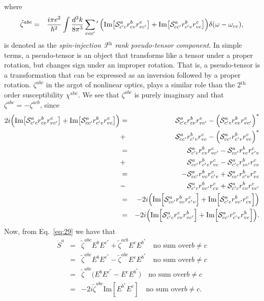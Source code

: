 \documentclass[floatfix,prb,aps,superscriptaddress,11pt]{revtex4}
\begin{document}
where
\begin{eqnarray}\label{trace52}
\tilde\zeta^{abc}
&=&
\frac{i\pi e^2}{\hbar^2}
\int\frac{d^3k}{8\pi^3}
\sum_{vcc'}\phantom{}^\prime\,
\Big(
\mbox{Im}\big[
{\cal S}^a_{c'c}r^b_{cv}r^c_{vc'}
\big]
+
\mbox{Im}\big[
{\cal S}^a_{cc'}r^b_{c'v}r^c_{vc}
\big]
\Big)
\delta(\omega-\omega_{cv})
,
\end{eqnarray}
is
denoted as the \textit{spin-injection 3$^\mathrm{th}$ rank
 pseudo-tensor component}.
 In simple terms, a pseudo-tensor is an object that transforms like a
  tensor under a proper rotation, but changes sign under an improper
  rotation. That is, a pseudo-tensor is a transformation that can be
  expressed as an inversion followed by a proper rotation.
$\zeta^{abc}$ in the argot of nonlinear optics, plays
a similar role than the 2$^\mathrm{th}$ order susceptibility
$\chi^{\mathrm{abc}}$. We see that $\zeta^{abc}$ is purely imaginary
and that $\zeta^{abc}=-\zeta^{acb}$, since 
\begin{eqnarray}\label{proof}
2i\Big(
\mbox{Im}\big[{\cal S}^a_{c'c}r^b_{cv}r^c_{vc'}\big]
+
\mbox{Im}\big[{\cal S}^a_{cc'}r^b_{c'v}r^c_{vc}\big]
\Big)
&=&
{\cal S}^a_{c'c}r^b_{cv}r^c_{vc'}
-
\Big({\cal S}^a_{c'c}r^b_{cv}r^c_{vc'}
\Big)^*
\nonumber \\
&+&
{\cal S}^a_{cc'}r^b_{c'v}r^c_{vc}
-
\Big(
{\cal S}^a_{cc'}r^b_{c'v}r^c_{vc}
\Big)^*
\nonumber \\
&=&
{\cal S}^a_{c'c}r^b_{cv}r^c_{vc'}
-
{\cal S}^a_{cc'}r^b_{vc}r^c_{c'v}
\nonumber \\
&+&
{\cal S}^a_{cc'}r^b_{c'v}r^c_{vc}
-
{\cal S}^a_{c'c}r^b_{vc'}r^c_{cv}
\nonumber \\
&=&
-
{\cal S}^a_{cc'}r^b_{vc}r^c_{c'v}
+
{\cal S}^a_{cc'}r^b_{c'v}r^c_{vc}
\nonumber\\
&-&
{\cal S}^a_{c'c}r^b_{vc'}r^c_{cv}
+
{\cal S}^a_{c'c}r^b_{cv}r^c_{vc'}
\nonumber \\
&=&
-2i\Big(
\mbox{Im}\Big[{\cal S}^a_{cc'}r^b_{vc}r^c_{c'v}\Big]
+
\mbox{Im}\Big[{\cal S}^a_{c'c}r^b_{vc'}r^c_{cv}\Big]
\Big)
\nonumber \\
&=&
-2i\Big(
\mbox{Im}\Big[{\cal S}^a_{c'c}r^c_{cv}r^b_{vc'}\Big]
+
\mbox{Im}\Big[{\cal S}^a_{cc'}r^c_{c'v}r^b_{vc}\Big]
\Big)
.
\end{eqnarray}
Now, from Eq.~\eqref{eq:29} we have that
\begin{eqnarray}\label{esdot}
 \dot{S}^a 
&=&
\tilde\zeta^{abc}
E^b
E^{c^*}
+
\tilde\zeta^{acb}
E^c
E^{b^*}\quad\mbox{no sum over} b\neq c
\nonumber\\
&=&
\tilde\zeta^{abc}
E^b
E^{c^*}
-
\tilde\zeta^{abc}
E^c
E^{b^*}\quad\mbox{no sum over} b\neq c
\nonumber\\
&=&
\tilde\zeta^{abc}
\big(
E^b
E^{c^*}
-
E^c
E^{b^*}
\big)\quad\mbox{no sum over} b\neq c
\nonumber\\
&=&
-2i\tilde\zeta^{abc}
\mbox{Im}[
E^{b^*}
E^c
]
\quad\mbox{no sum over} b\neq c
.
\end{eqnarray}
\end{document}
